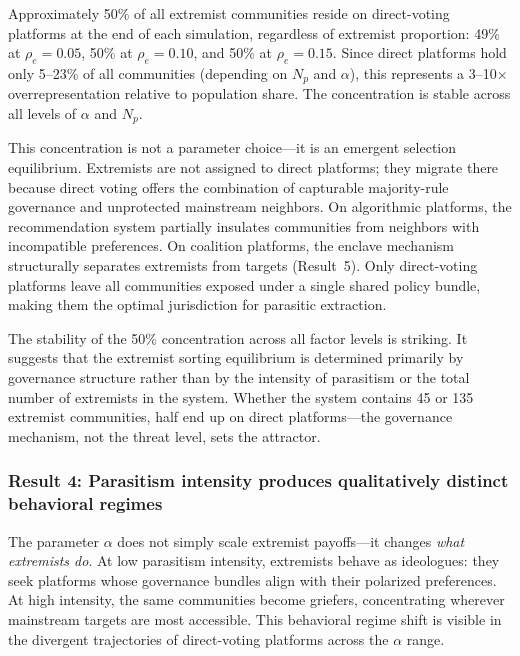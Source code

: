 \documentclass{article}
\begin{document}
Approximately 50\% of all extremist communities reside on direct-voting platforms at the end of each simulation, regardless of extremist proportion: 49\% at $\rho_e = 0.05$, 50\% at $\rho_e = 0.10$, and 50\% at $\rho_e = 0.15$. Since direct platforms hold only 5--23\% of all communities (depending on $N_p$ and $\alpha$), this represents a 3--10$\times$ overrepresentation relative to population share. The concentration is stable across all levels of $\alpha$ and $N_p$.

This concentration is not a parameter choice---it is an emergent selection equilibrium. Extremists are not assigned to direct platforms; they migrate there because direct voting offers the combination of capturable majority-rule governance and unprotected mainstream neighbors. On algorithmic platforms, the recommendation system partially insulates communities from neighbors with incompatible preferences. On coalition platforms, the enclave mechanism structurally separates extremists from targets (Result~5). Only direct-voting platforms leave all communities exposed under a single shared policy bundle, making them the optimal jurisdiction for parasitic extraction.

The stability of the 50\% concentration across all factor levels is striking. It suggests that the extremist sorting equilibrium is determined primarily by governance structure rather than by the intensity of parasitism or the total number of extremists in the system. Whether the system contains 45 or 135 extremist communities, half end up on direct platforms---the governance mechanism, not the threat level, sets the attractor.

\subsubsection{Result 4: Parasitism intensity produces qualitatively distinct behavioral regimes}

The parameter $\alpha$ does not simply scale extremist payoffs---it changes \textit{what extremists do}. At low parasitism intensity, extremists behave as ideologues: they seek platforms whose governance bundles align with their polarized preferences. At high intensity, the same communities become griefers, concentrating wherever mainstream targets are most accessible. This behavioral regime shift is visible in the divergent trajectories of direct-voting platforms across the $\alpha$ range.
\end{document}
